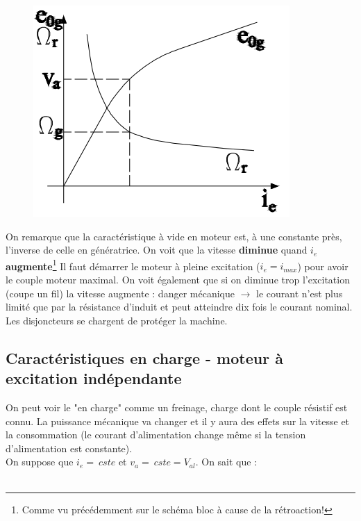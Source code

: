 	\begin{figure}
	\includegraphics[scale=0.34]{ch4/image22.png}
	\end{figure}
	On remarque que la caractéristique à vide en moteur est, à une constante près, 
	l'inverse de celle en génératrice. On voit que la vitesse \textbf{diminue} quand 
	$i_e$ \textbf{augmente}\footnote{Comme vu précédemment sur le schéma bloc à cause 
	de la rétroaction!} Il faut démarrer le moteur à pleine excitation ($i_e=i_{max}$) 
	pour avoir le couple moteur maximal. On voit également que si on diminue trop 
	l'excitation (coupe un fil) la vitesse augmente : danger mécanique $\rightarrow$ le 
	courant n'est plus limité que par la résistance d'induit et peut atteindre dix 
	fois le courant nominal. Les disjoncteurs se chargent de protéger la machine.
	
	
	\subsection{Caractéristiques en charge - moteur à excitation indépendante}
	On peut voir le "en charge" comme un freinage, charge dont le couple résistif est 
	connu. La puissance mécanique va changer et il y aura des effets sur la vitesse et 
	la consommation (le courant d'alimentation change même si la tension d'alimentation 
	est constante).\\
	On suppose que $i_e=\ cste$ et $v_a =\ cste = V_{al}$. On sait que :\\
	
	\ 
	
